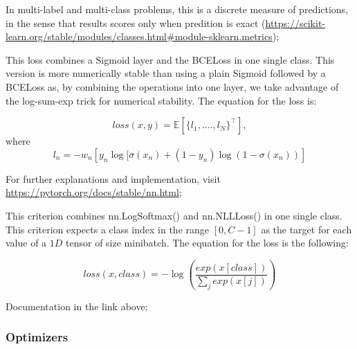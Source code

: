 \documentclass{article}
\begin{document}
\begin{description}[align=left]

\item [Accuracy:] In multi-label and multi-class problems, this is a discrete measure of predictions, in the sense that results scores only when predition is exact (\url{https://scikit-learn.org/stable/modules/classes.html#module-sklearn.metrics});

\item [BCEWithLogitsLoss:] This loss combines a Sigmoid layer and the BCELoss in one single class. This version is more numerically stable than using a plain Sigmoid followed by a BCELoss as, by combining the operations into one layer, we take advantage of the log-sum-exp trick for numerical stability. The equation for the loss is:

\begin{equation}
loss(x,y) = \mathbb{E} \left[ \{ l_1,....,l_N\} ^\top \right] , 
\end{equation}
where
\begin{equation}
l_{n} = - w_{n} \left[ y_{n}  \log[\sigma(x_{n}) + (1-y_{n})  \log(1 - \sigma(x_{n})) \right]
\end{equation}


For further explanations and implementation, visit \url{https://pytorch.org/docs/stable/nn.html};

\item [CrossEntropyLoss:] This criterion combines nn.LogSoftmax() and nn.NLLLoss() in one single class. This criterion expects a class index in the range $[0,C-1]$ as the target for each value of a $1D$ tensor of size minibatch. The equation for the loss is the following:

\begin{equation}
loss(x,class) = - \log\left(\frac{exp(x[class])}{\sum_{j}{exp(x[j])}}\right)
\end{equation}

Documentation in the link above;

\item[LOSS DI KERAS]

\end{description}


\subsubsection{Optimizers}
\end{document}
